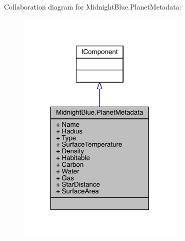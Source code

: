 Collaboration diagram for Midnight\+Blue.\+Planet\+Metadata\+:\nopagebreak
\begin{figure}[H]
\begin{center}
\leavevmode
\includegraphics[width=227pt]{class_midnight_blue_1_1_planet_metadata__coll__graph}
\end{center}
\end{figure}
